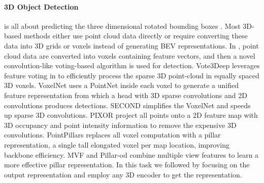 \documentclass[10pt,twocolumn,letterpaper]{article}
\begin{document}
\paragraph{3D Object Detection} is all about predicting the three dimensional rotated bounding boxes \cite{geiger2012we, lang2019pointpillars, qi2018frustum, yan2018second, yang20203dssd, yang2019std}. Most 3D-based methods either use point cloud data directly or require converting these data into 3D grids or voxels instead of generating BEV representations. In \cite{wang2015voting}, point cloud data are converted into voxels containing feature vectors, and then a novel convolution-like voting-based algorithm is used for detection. Vote3Deep \cite{engelcke2017vote3deep} leverages feature voting in \cite{wang2015voting} to efficiently process the sparse 3D point-cloud in equally spaced 3D voxels. VoxelNet \cite{zhou2018voxelnet} uses a PointNet \cite{qi2017pointnet} inside each voxel to generate a unified feature representation from which a head with 3D sparse convolutions \cite{graham20183d} and 2D convolutions produces detections. SECOND \cite{yan2018second} simplifies the VoxelNet and speeds up sparse 3D convolutions. PIXOR \cite{yang2018pixor} project all points onto a 2D feature map with 3D occupancy and point intensity information to remove the expensive 3D convolutions. PointPillars\cite{lang2019pointpillars} replaces all voxel computation with a pillar representation, a single tall elongated voxel per map location, improving backbone efficiency. MVF \cite{zhou2020end} and Pillar-od \cite{wang2020pillar} combine multiple view features to learn a more effective pillar representation. In this task we followed \cite{yin2020center, ge2020afdet} by focusing on the output representation and employ any 3D encoder to get the representation.
\end{document}

